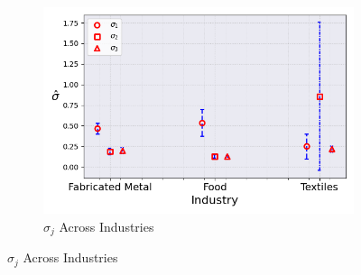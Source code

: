 \documentclass{article}
\begin{document}
\begin{figure}[ht!]
\begin{subfigure}[t]{0.32\textwidth}
    \end{subfigure}
    \begin{subfigure}[t]{0.32\textwidth}
        \centering
        \includegraphics[width=\textwidth]{figure/stationary_normal_sigma_across_industries_m3.png}
        \caption{$\hat\sigma_j$ Across Industries}
    \end{subfigure}
\end{figure}
\end{document}
